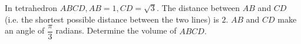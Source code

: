 In tetrahedron $ABCD, AB=1, CD = \sqrt{3}.$ The distance between $AB$ and $CD$ (i.e. the shortest possible distance between the two lines) is $2.$ $AB$ and $CD$ make an angle of $\dfrac{\pi}{3}$ radians. Determine the volume of $ABCD.$

